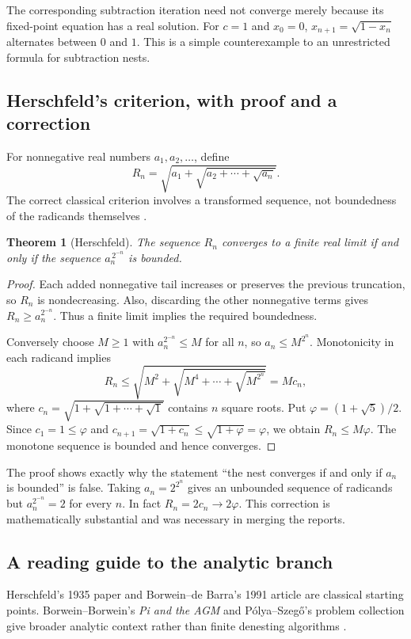 \documentclass[11pt,letterpaper]{article}
\numberwithin{equation}{section}
\newtheorem{theorem}{Theorem}[section]
\theoremstyle{definition}
\theoremstyle{remark}
\begin{document}
The corresponding subtraction iteration need not converge merely because its fixed-point equation has a real solution. For $c=1$ and $x_0=0$, $x_{n+1}=\sqrt{1-x_n}$ alternates between $0$ and $1$. This is a simple counterexample to an unrestricted formula for subtraction nests.

\subsection{Herschfeld's criterion, with proof and a correction}
For nonnegative real numbers $a_1,a_2,\ldots$, define
\[
R_n=\sqrt{a_1+\sqrt{a_2+\cdots+\sqrt{a_n}}}.
\]
The correct classical criterion involves a transformed sequence, not boundedness of the radicands themselves \cite{herschfeld}.

\begin{theorem}[Herschfeld]\label{thm:herschfeld}
The sequence $R_n$ converges to a finite real limit if and only if the sequence $a_n^{\,2^{-n}}$ is bounded.
\end{theorem}

\begin{proof}
Each added nonnegative tail increases or preserves the previous truncation, so $R_n$ is nondecreasing. Also, discarding the other nonnegative terms gives $R_n\ge a_n^{2^{-n}}$. Thus a finite limit implies the required boundedness.

Conversely choose $M\ge1$ with $a_n^{2^{-n}}\le M$ for all $n$, so $a_n\le M^{2^n}$. Monotonicity in each radicand implies
\[
R_n\le\sqrt{M^2+\sqrt{M^4+\cdots+\sqrt{M^{2^n}}}}
=M c_n,
\]
where $c_n=\sqrt{1+\sqrt{1+\cdots+\sqrt1}}$ contains $n$ square roots. Put $\varphi=(1+\sqrt5)/2$. Since $c_1=1\le\varphi$ and $c_{n+1}=\sqrt{1+c_n}\le\sqrt{1+\varphi}=\varphi$, we obtain $R_n\le M\varphi$. The monotone sequence is bounded and hence converges.
\end{proof}

The proof shows exactly why the statement ``the nest converges if and only if $a_n$ is bounded'' is false. Taking $a_n=2^{2^n}$ gives an unbounded sequence of radicands but $a_n^{2^{-n}}=2$ for every $n$. In fact $R_n=2c_n\to2\varphi$. This correction is mathematically substantial and was necessary in merging the reports.

\subsection{A reading guide to the analytic branch}
Herschfeld's 1935 paper and Borwein--de Barra's 1991 article are classical starting points. Borwein--Borwein's \emph{Pi and the AGM} and P\'olya--Szeg\H{o}'s problem collection give broader analytic context rather than finite denesting algorithms \cite{herschfeld,borweinradicals,piagm,polya}.
\end{document}

